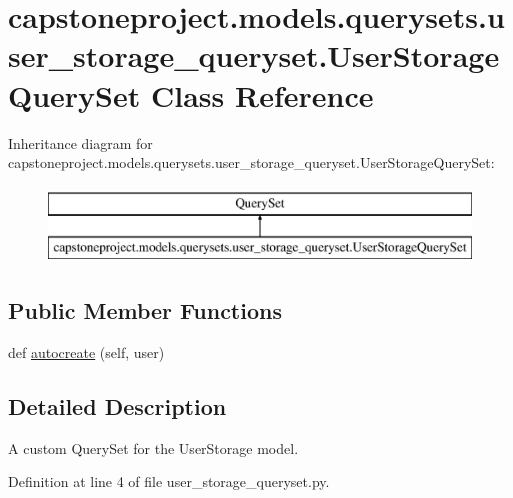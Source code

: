 \hypertarget{classcapstoneproject_1_1models_1_1querysets_1_1user__storage__queryset_1_1_user_storage_query_set}{}\section{capstoneproject.\+models.\+querysets.\+user\+\_\+storage\+\_\+queryset.\+User\+Storage\+Query\+Set Class Reference}
\label{classcapstoneproject_1_1models_1_1querysets_1_1user__storage__queryset_1_1_user_storage_query_set}
Inheritance diagram for capstoneproject.\+models.\+querysets.\+user\+\_\+storage\+\_\+queryset.\+User\+Storage\+Query\+Set\+:\begin{figure}[H]
\begin{center}
\leavevmode
\includegraphics[height=2.000000cm]{classcapstoneproject_1_1models_1_1querysets_1_1user__storage__queryset_1_1_user_storage_query_set}
\end{center}
\end{figure}
\subsection*{Public Member Functions}
\begin{DoxyCompactItemize}
\item 
def \mbox{\hyperlink{classcapstoneproject_1_1models_1_1querysets_1_1user__storage__queryset_1_1_user_storage_query_set_a422209e3415e6996c8ad8c628ff20b41}{autocreate}} (self, user)
\end{DoxyCompactItemize}


\subsection{Detailed Description}
\begin{DoxyVerb}A custom QuerySet for the UserStorage model.\end{DoxyVerb}
 

Definition at line 4 of file user\+\_\+storage\+\_\+queryset.\+py.



